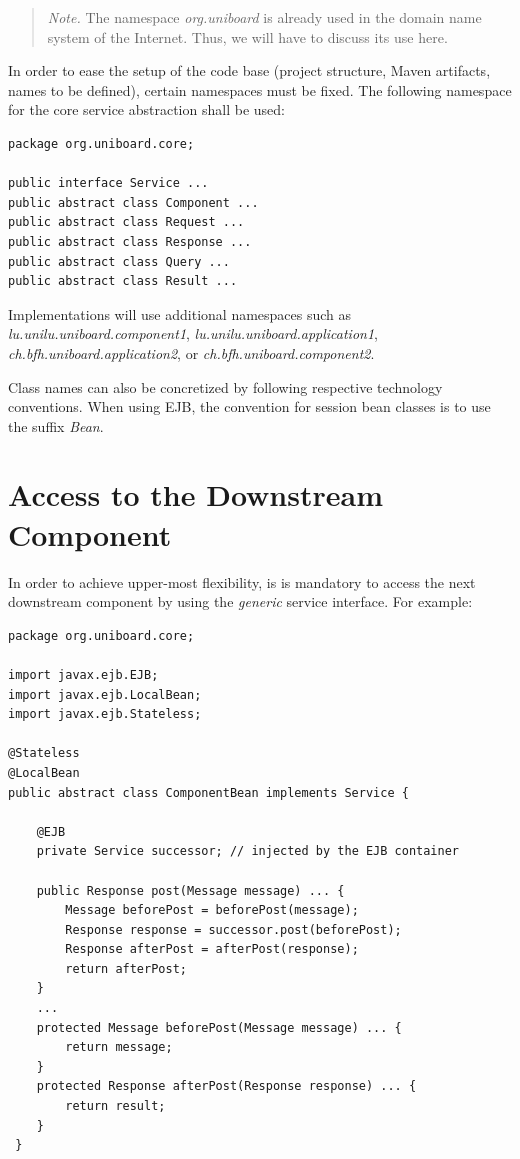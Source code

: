 \documentclass[oneside]{scrreprt}
\begin{document}
\begin{quote}
	\emph{Note.} The namespace \emph{org.uniboard} is already
	used in the domain name system of the Internet. Thus,
	we will have to discuss its use here.
\end{quote}

In order to ease the setup of the code base (project structure,
Maven artifacts, names to be defined), certain namespaces must be fixed.
The following namespace for the core service abstraction shall
be used:

\begin{lstlisting}
package org.uniboard.core;

public interface Service ...
public abstract class Component ...
public abstract class Request ...
public abstract class Response ...
public abstract class Query ...
public abstract class Result ...
\end{lstlisting}

Implementations will use additional namespaces such as
\emph{lu.unilu.uniboard.component1},
\emph{lu.unilu.uniboard.application1},
\emph{ch.bfh.uniboard.application2}, or
\emph{ch.bfh.uniboard.component2}.

Class names can also be concretized by following respective
technology conventions. When using EJB, the convention for
session bean classes is to use the suffix \emph{Bean}.


\section{Access to the Downstream Component}

In order to achieve upper-most flexibility, is is mandatory to
access the next downstream component by using the \emph{generic}
service interface. For example:

\begin{lstlisting}
package org.uniboard.core;

import javax.ejb.EJB;
import javax.ejb.LocalBean;
import javax.ejb.Stateless;

@Stateless
@LocalBean
public abstract class ComponentBean implements Service {

    @EJB
    private Service successor; // injected by the EJB container

    public Response post(Message message) ... {
        Message beforePost = beforePost(message);
        Response response = successor.post(beforePost);
        Response afterPost = afterPost(response);
        return afterPost;
    }
    ...
    protected Message beforePost(Message message) ... {
        return message;
    }
    protected Response afterPost(Response response) ... {
        return result;
    }
 }
\end{lstlisting}
\end{document}

